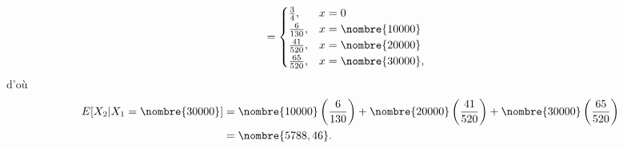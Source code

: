 \begin{exercice}
\begin{sol}
\begin{enumerate}[1.]
\begin{multline*}
\begin{split}
          &=
          \begin{cases}
            \frac{3}{4}, & x = 0 \\
            \frac{6}{130}, & x = \nombre{10000} \\
            \frac{41}{520}, & x = \nombre{20000} \\
            \frac{65}{520}, & x = \nombre{30000},
          \end{cases}
        \end{split}
      \end{multline*}
      d'où
      \begin{align*}
        \esp{X_2|X_1 = \nombre{30000}}
        &= \nombre{10000} \left( \frac{6}{130} \right)
        + \nombre{20000} \left( \frac{41}{520} \right)
        + \nombre{30000} \left( \frac{65}{520} \right) \\
        &=\nombre{5788,46}.
      \end{align*}
    \end{enumerate}
  \end{sol}
\end{exercice}

